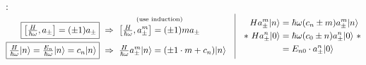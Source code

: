\documentclass[12pt]{article}
\begin{document}
\vfill\noindent
:\\[-8pt]
\(
    \begin{aligned}
        \boxed{ \big[\tfrac{H}{\hbar\omega}, a_{\pm}\big] = (\pm 1) a_\pm } &
            \ \Rightarrow\ \begin{gathered}[b]
                \text{\scriptsize(use induction)}\\[-3pt]
                \big[\tfrac{H}{\hbar\omega}, a_{\pm}^m \big] = (\pm 1)m a_\pm
            \end{gathered}
            \\
        \boxed{ \tfrac{H}{\hbar\omega} |n\rangle = \tfrac{E_n}{\hbar\omega} |n\rangle = c_n |n\rangle } &
            \ \Rightarrow\ \tfrac{H}{\hbar\omega} a_{\pm}^m | n \rangle = (\pm 1 \cdot m + c_n ) | n \rangle
    \end{aligned}
    \hspace{10pt} \vline \hspace{10pt}
            \begin{aligned}
                H a_\pm^m |n\rangle & = \hbar\omega (c_n \pm m) a_\pm^m |n\rangle \\
                *\ H a_\pm^n |0\rangle & = \hbar\omega (c_0 \pm n) a_\pm^n |0\rangle \ * \\
                & = E_{n0} \cdot a_\pm^n |0\rangle
            \end{aligned}
\) 

\vfill
\end{document}

